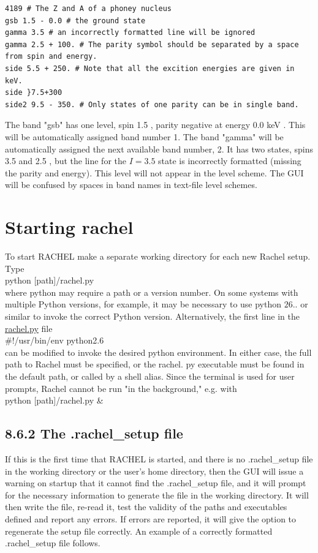 \documentclass[10pt]{article}
\begin{document}
\begin{verbatim}
4189 # The Z and A of a phoney nucleus
gsb 1.5 - 0.0 # the ground state
gamma 3.5 # an incorrectly formatted line will be ignored
gamma 2.5 + 100. # The parity symbol should be separated by a space from spin and energy.
side 5.5 + 250. # Note that all the excition energies are given in keV.
side }7.5+300
side2 9.5 - 350. # Only states of one parity can be in single band.
\end{verbatim}

The band "gsb" has one level, spin 1.5 , parity negative at energy 0.0 keV . This will be automatically assigned band number 1. The band "gamma" will be automatically assigned the next available band number, 2. It has two states, spins 3.5 and 2.5 , but the line for the $I=3.5$ state is incorrectly formatted (missing the parity and energy). This level will not appear in the level scheme. The GUI will be confused by spaces in band names in text-file level schemes.

\section*{Starting rachel}
To start RACHEL make a separate working directory for each new Rachel setup. Type\\[0pt]
python [path]/rachel.py\\
where python may require a path or a version number. On some systems with multiple Python versions, for example, it may be necessary to use python $26 .$. or similar to invoke the correct Python version. Alternatively, the first line in the \href{http://rachel.py}{rachel.py} file\\
\#!/usr/bin/env python2.6\\
can be modified to invoke the desired python environment. In either case, the full path to Rachel must be specified, or the rachel. py executable must be found in the default path, or called by a shell alias. Since the terminal is used for user prompts, Rachel cannot be run "in the background," e.g. with\\[0pt]
python [path]/rachel.py \&

\subsection*{8.6.2 The .rachel\_setup file}
If this is the first time that RACHEL is started, and there is no .rachel\_setup file in the working directory or the user's home directory, then the GUI will issue a warning on startup that it cannot find the .rachel\_setup file, and it will prompt for the necessary information to generate the file in the working directory. It will then write the file, re-read it, test the validity of the paths and executables defined and report any errors. If errors are reported, it will give the option to regenerate the setup file correctly. An example of a correctly formatted .rachel\_setup file follows.
\end{document}
